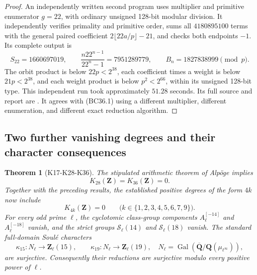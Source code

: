 \documentclass[11pt,a4paper]{article}
\newtheorem{theorem}{Theorem}[section]
\theoremstyle{definition}
\begin{document}
\begin{proof}
An independently written second program uses multiplier and primitive
enumerator $g=22$, with ordinary unsigned 128-bit modular division.
It independently verifies primality and primitive order, sums all
$4180895100$ terms with the general paired coefficient
$2\lfloor22a/p\rfloor-21$, and checks both endpoints $-1$.
Its complete output is
\[
 S_{22}=1660697019,\qquad
 \frac{n22^{n-1}}{22^n-1}=7951289779,\qquad
 B_n=1827838999\pmod p.
\]
The orbit product is below $22p<2^{38}$, each coefficient times a
weight is below $21p<2^{38}$, and each weight product is below
$p^2<2^{66}$, within its unsigned 128-bit type.
This independent run took approximately $51.28$ seconds.
Its full source and report are
.
It agrees with (BC36.1) using a different multiplier, different
enumeration, and different exact reduction algorithm.
\end{proof}

\subsection{Two further vanishing degrees and their character consequences}
\label{sec:k28-k36-vanishing}

\begin{theorem}[K17-K28-K36]\label{thm:k28-k36-vanish}
The stipulated arithmetic theorem of Alp\"oge implies
\[
                         K_{28}(\mathbf Z)=K_{36}(\mathbf Z)=0.
 \tag{HK2.1}
\]
Together with the preceding results, the established positive degrees
of the form $4k$ now include
\[
             K_{4k}(\mathbf Z)=0
             \qquad\bigl(k\in\{1,2,3,4,5,6,7,9\}\bigr).
 \tag{HK2.2}
\]
For every odd prime $\ell$, the cyclotomic class-group components
$A_\ell^{[-14]}$ and $A_\ell^{[-18]}$ vanish, and the strict groups
$\mathcal S_\ell(14)$ and $\mathcal S_\ell(18)$ vanish.
The standard full-domain Soul\'e characters
\[
 \kappa_{15}:N_\ell\longrightarrow\mathbf Z_\ell(15),
 \qquad
 \kappa_{19}:N_\ell\longrightarrow\mathbf Z_\ell(19),
 \quad
 N_\ell=\operatorname{Gal}
  (\overline{\mathbf Q}/\mathbf Q(\mu_{\ell^\infty})),
\]
are surjective. Consequently their reductions are surjective modulo
every positive power of $\ell$.
\end{theorem}
\end{document}
